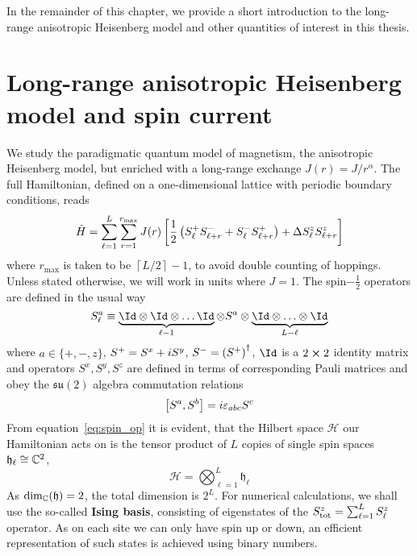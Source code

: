 In the remainder of this chapter, we provide a short introduction to the long-range anisotropic Heisenberg model
and other quantities of interest in this thesis.

\section{Long-range anisotropic Heisenberg model and spin current}

We study the paradigmatic quantum model of magnetism, the anisotropic Heisenberg
model, but enriched with a long-range exchange \(J(r) = J/r^{\alpha}\). The full Hamiltonian,
defined on a one-dimensional lattice with periodic boundary conditions, reads
\begin{equation}
    \hat{H}  = \sum_{\ell=1}^{L}\sum_{r=1}^{r_{\mathrm{max}}} J(r) \left[\frac{1}{2} \left(
        S^{+}_{\ell}S^{-}_{\ell+r} + S^{-}_{\ell}S^{+}_{\ell+r}\right) + \Delta S^{z}_{\ell}S^{z}_{\ell+r}
        \right]
    \label{eq:long_range}
\end{equation}
where \(r_{\mathrm{max}}\) is taken to be \(\left\lceil L/2\right\rceil - 1 \), to avoid double counting of hoppings.
Unless stated otherwise, we will work in units where \(J = 1\).
The spin\(-\frac{1}{2}\) operators are defined in the usual way
\begin{equation}
    S_{\ell}^{a} \equiv  \underbrace{\Id \otimes \Id \otimes \ldots \Id}_{\ell-1} \otimes S^{a} \otimes \underbrace{\Id \otimes \ldots \otimes \Id}_{L-\ell}
    \label{eq:spin_op}
\end{equation}
where \(a\in\{+,-,z\}\), \(S^{+} = S^x + i S^y\), \(S^{-} = \left(S^{+}\right)^{\dagger}\),
\(\Id\) is a \(2\cross 2\) identity matrix and operators \(S^x,S^y,S^z\) are defined in terms
of corresponding Pauli matrices and obey the \(\mathfrak{su}(2)\) algebra commutation relations
\begin{equation}
    \comm{S^a}{S^b} = i \varepsilon_{abc} S^c
\end{equation}
From equation~\eqref{eq:spin_op} it is evident, that the Hilbert space \(\mathcal{H}\) our Hamiltonian acts on
is the tensor product of \(L\) copies of single spin spaces \(\mathfrak{h}_{\ell} \cong \mathbb{C}^2\),
\begin{equation}
    \mathcal{H} = \bigotimes_{\ell=1}^{L} \mathfrak{h}_{\ell}
\end{equation}
As \(\mathrm{dim_{\mathbb{C}}}(\mathfrak{h}) = 2\), the total dimension is \(2^L\).
For numerical calculations, we shall use the so-called \textbf{Ising basis}, consisting of eigenstates
of the \(S^z_{\mathrm{tot}} = \sum_{\ell=1}^{L} S^{z}_{\ell}\) operator. As on each site we can only
have spin up or down, an efficient representation of such states is achieved using binary numbers.


